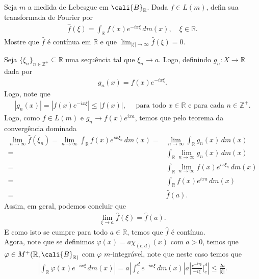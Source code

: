 \begin{homeworkProblem}[6]
  Seja $m$ a medida de Lebesgue em $\cali{B}_{\mathbb{R}}$. Dada $f\in L(m)$, defin sua transformada de Fourier por
  \begin{align*}
    \hat{f}(\xi)=\int_{\mathbb{R}}f(x)e^{-ix\xi}\,dm(x),\quad\xi\in\mathbb{R}.
  \end{align*}
  Mostre que $\hat{f}$ é contínua em $\mathbb{R}$ e que $\lim_{|\xi|\to \infty}\hat{f}(\xi)=0$. 
  \begin{solution}
    Seja $\{\xi_n\}_{n\in\mathbb{Z}^{+}}\subseteq \mathbb{R}$ uma sequência tal que $\xi_n\to a$. Logo, definindo $g_n:X\to\mathbb{R}$ dada por
    \begin{align*}
      g_n(x)=f(x)e^{-ix\xi}.
    \end{align*}
    Logo, note que
    \begin{align*}
      |g_n(x)|=\left| f(x)e^{-ix\xi} \right|\leq \left| f(x) \right|,\quad\text{ para todo }x\in\mathbb{R}\text{ e para cada }n\in\mathbb{Z}^{+}.
    \end{align*}
    Logo, como $f\in L(m)$ e $g_n\to f(x)e^{ixa}$, temos que pelo teorema da convergência dominada
    \begin{align*}
      \lim_{n \to \infty}\hat{f}(\xi_n)=\lim_{n \to \infty}\int_{\mathbb{R}}f(x)e^{ix\xi_n}\,dm(x)=&\lim_{n \to \infty}\int_{\mathbb{R}}g_n(x)\,dm(x)\\
      =&\int_{\mathbb{R}}\lim_{n \to \infty}g_n(x)\,dm(x)\\
      =&\int_{\mathbb{R}}\lim_{n \to \infty}f(x)e^{ix\xi_n}\,dm(x)\\
      =&\int_{\mathbb{R}}f(x)e^{ixa}\,dm(x)\\
      =&\hat{f}(a).
    \end{align*}
    Assim, em geral, podemos concluir que
    \begin{align*}
      \lim_{\xi \to a}\hat{f}(\xi)=\hat{f}(a).
    \end{align*}
    E como isto se cumpre para todo $a\in\mathbb{R}$, temos que $\hat{f}$ é contínua.\\
    Agora, note que se definimos $\varphi(x)=a\chi_{(c,d)}(x)$ com $a>0$, temos que $\varphi\in M^{+}(\mathbb{R},\cali{B}_{\mathbb{R})}$ com $\varphi$ $m$-integrável, note que neste caso temos que
    \begin{align*}
      \left|\int_{\mathbb{R}}\varphi(x)e^{-ix\xi}\,dm(x)\right|=a\left| \int_{c}^{d}e^{-ix\xi}\,dm(x)\right|a\left| \frac{e^{-ix\xi}}{-i\xi}\Big|_{c}^{d} \right|\leq \frac{2a}{|\xi|}.
    \end{align*}

\end{solution}
\end{homeworkProblem}
